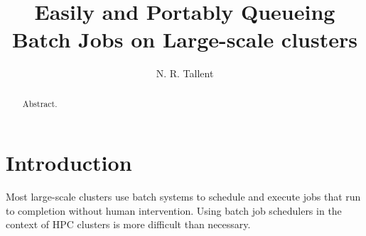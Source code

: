 
\title{Easily and Portably Queueing Batch Jobs on Large-scale clusters}

\author{N. R. Tallent}




\begin{abstract}

Abstract.

\end{abstract}






\section{Introduction}
\label{sec:introduction}

Most large-scale clusters use batch systems to schedule and execute jobs that run to completion without human intervention.
Using batch job schedulers in the context of HPC clusters is more difficult than necessary.

